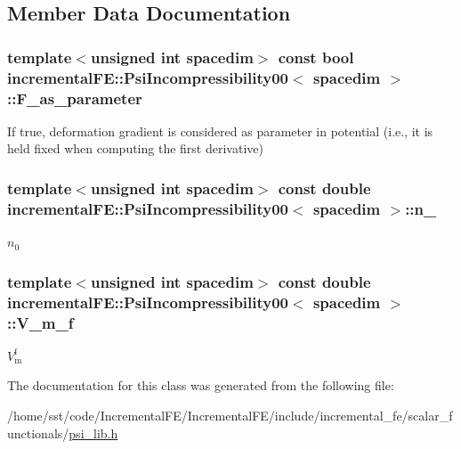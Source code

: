 \subsection{Member Data Documentation}
\subsubsection[{\texorpdfstring{F\+\_\+as\+\_\+parameter}{F_as_parameter}}]{\setlength{\rightskip}{0pt plus 5cm}template$<$unsigned int spacedim$>$ const bool {\bf incremental\+F\+E\+::\+Psi\+Incompressibility00}$<$ spacedim $>$\+::F\+\_\+as\+\_\+parameter\hspace{0.3cm}{\ttfamily [private]}}\hypertarget{classincremental_f_e_1_1_psi_incompressibility00_aca72a8996f35c7dbd664765af62dec95}{}\label{classincremental_f_e_1_1_psi_incompressibility00_aca72a8996f35c7dbd664765af62dec95}
If {\ttfamily true}, deformation gradient is considered as parameter in potential (i.\+e., it is held fixed when computing the first derivative) 
\subsubsection[{\texorpdfstring{n\+\_\+0}{n_0}}]{\setlength{\rightskip}{0pt plus 5cm}template$<$unsigned int spacedim$>$ const double {\bf incremental\+F\+E\+::\+Psi\+Incompressibility00}$<$ spacedim $>$\+::n\+\_\hspace{0.3cm}{\ttfamily [private]}}\hypertarget{classincremental_f_e_1_1_psi_incompressibility00_a21e9fc511e9410d0fbc9d0514f801f69}{}\label{classincremental_f_e_1_1_psi_incompressibility00_a21e9fc511e9410d0fbc9d0514f801f69}
$n_0$ 
\subsubsection[{\texorpdfstring{V\+\_\+m\+\_\+f}{V_m_f}}]{\setlength{\rightskip}{0pt plus 5cm}template$<$unsigned int spacedim$>$ const double {\bf incremental\+F\+E\+::\+Psi\+Incompressibility00}$<$ spacedim $>$\+::V\+\_\+m\+\_\+f\hspace{0.3cm}{\ttfamily [private]}}\hypertarget{classincremental_f_e_1_1_psi_incompressibility00_adb4a98d91d9105e56d71b1c2bbb731fe}{}\label{classincremental_f_e_1_1_psi_incompressibility00_adb4a98d91d9105e56d71b1c2bbb731fe}
$V^\mathrm{f}_\mathrm{m}$ 

The documentation for this class was generated from the following file\+:\begin{DoxyCompactItemize}
\item 
/home/sst/code/\+Incremental\+F\+E/\+Incremental\+F\+E/include/incremental\+\_\+fe/scalar\+\_\+functionals/\hyperlink{psi__lib_8h}{psi\+\_\+lib.\+h}\end{DoxyCompactItemize}
